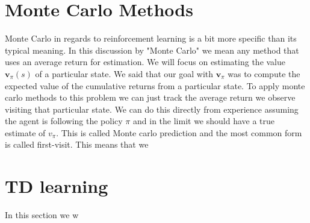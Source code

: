 \section{Monte Carlo Methods}

Monte Carlo in regards to reinforcement learning is a bit more specific than its typical meaning. In this discussion by "Monte Carlo" we mean any method that uses an average return for estimation. We will focus on estimating the value $\mathbf{v}_{\pi}(s)$ of a particular state. We said that our goal with $\mathbf{v}_{\pi}$ was to compute the expected value of the cumulative returns from a particular state. To apply monte carlo methods to this problem we can just track the average return we observe visiting that particular state. We can do this directly from experience assuming the agent is following the policy $\pi$ and in the limit we should have a true estimate of $v_{\pi}$. This is called Monte carlo prediction and the most common form is called first-visit. This means that we


\section{TD learning}

In this section we w